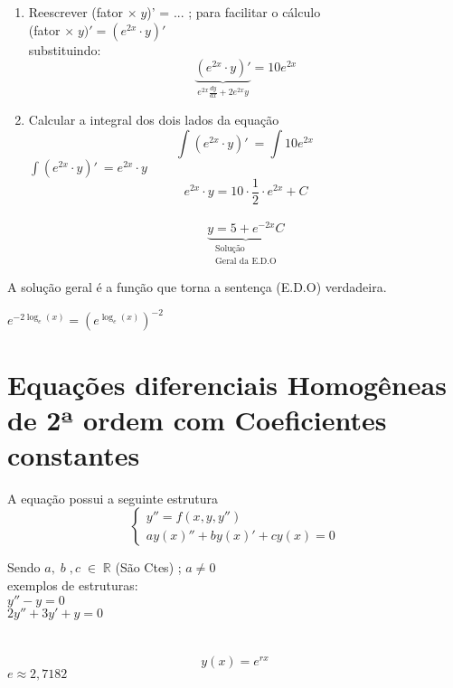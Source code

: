 \documentclass{article}
\begin{document}
{\begin{enumerate}
    \item Reescrever (fator $\times  \;y$)' = ... \;; para facilitar o cálculo\\
    
    (fator $\times \; y )' = (e^{2x}\cdot y)' $\\
    substituindo:\\
    \[\underbrace{(e^{2x}\cdot y)'}_{e^{2x}\frac{dy}{dx}+2e^{2x}y} = 10e^{2x}\]

    \item Calcular a integral dos dois lados da equação
    \[\int(e^{2x}\cdot y)'\ = \int 10e^{2x}\ \]
    $\int(e^{2x}\cdot y)'\ = e^{2x} \cdot y$ 
    \[e^{2x}\cdot y = 10\cdot \frac{1}{2} \cdot e^{2x} + C\]\\
    \[\underbrace{\boxed{y= 5 + e^{-2x}C}}_{\substack{\text{Solução }\\\text{Geral  da E.D.O}}}\]
    
\end{enumerate}
 A solução geral é a função que torna a sentença (E.D.O) verdadeira.

$ e^{-2 \log_e(x)} = \left(e^{\log_e(x)}  \right)^{-2} $

\newpage
\section{Equações diferenciais Homogêneas de 2ª ordem com Coeficientes constantes}
A equação possui a seguinte estrutura
\[
\left\{
\begin{aligned}
y'' = f(x,y,y'') \\
ay(x)''+by(x)'+cy(x) = 0 
\end{aligned}
\right.
\]

Sendo $a, \; b\;, c\; \in\;\mathbb{R}$ (São Ctes) \;\; ; \;\; $a\neq 0$\\


exemplos de estruturas:\\
$y''-y=0$\\
$2y''+3y'+y=0$\\
\\


{\large{}}\\
\[y(x)=e^{rx}\]
$e\approx 2,7182$\\

}
\end{document}
